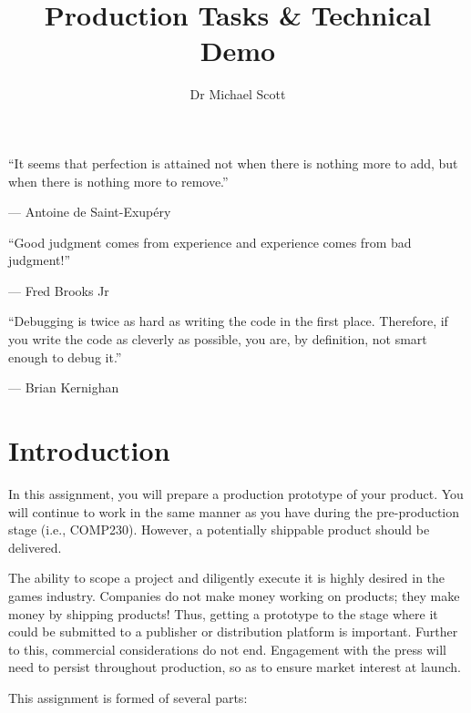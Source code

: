 \documentclass{../fal_assignment}
\title{Production Tasks \& Technical Demo}
\author{Dr Michael Scott}
\begin{document}
\maketitle

\begin{marginquote}
    ``It seems that perfection is attained not when there is nothing more to add,
        but when there is nothing more to remove.''
    
    --- Antoine de Saint-Exup\'ery
    
    \marginquoterule
    
    ``Good judgment comes from experience and experience comes from bad judgment!''
    
    --- Fred Brooks Jr
    
    \marginquoterule
    
    ``Debugging is twice as hard as writing the code in the first place.
     Therefore, if you write the code as cleverly as possible, you are, by definition, not smart enough to debug it.'' 
 
         --- Brian Kernighan
     
\end{marginquote}

\section*{Introduction}

In this assignment, you will prepare a production prototype of your product. You will continue to work in the same manner as you have during the pre-production stage (i.e., COMP230). However, a potentially shippable product should be delivered.

The ability to scope a project and diligently execute it is highly desired in the games industry. Companies do not make money working on products; they make money by shipping products! Thus, getting a prototype to the stage where it could be submitted to a publisher or distribution platform is important. Further to this, commercial considerations do not end. Engagement with the press will need to persist throughout production, so as to ensure market interest at launch.

This assignment is formed of several parts:
\end{document}
